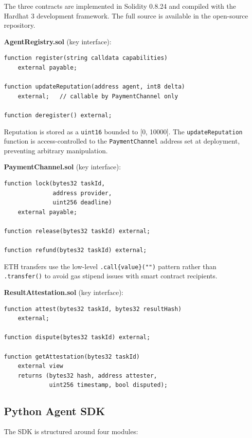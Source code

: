 \documentclass[conference]{IEEEtran}
\begin{document}
The three contracts are implemented in Solidity 0.8.24 and compiled
with the Hardhat 3 development framework.  The full source is
available in the open-source repository.

\textbf{AgentRegistry.sol} (key interface):
\begin{lstlisting}[caption={AgentRegistry interface}]
function register(string calldata capabilities)
    external payable;

function updateReputation(address agent, int8 delta)
    external;   // callable by PaymentChannel only

function deregister() external;
\end{lstlisting}

Reputation is stored as a \texttt{uint16} bounded to [0, 10000].
The \texttt{updateReputation} function is access-controlled to the
\texttt{PaymentChannel} address set at deployment, preventing arbitrary
manipulation.

\textbf{PaymentChannel.sol} (key interface):
\begin{lstlisting}[caption={PaymentChannel interface}]
function lock(bytes32 taskId,
              address provider,
              uint256 deadline)
    external payable;

function release(bytes32 taskId) external;

function refund(bytes32 taskId) external;
\end{lstlisting}

ETH transfers use the low-level \texttt{.call\{value\}("")} pattern
rather than \texttt{.transfer()} to avoid gas stipend issues with
smart contract recipients.

\textbf{ResultAttestation.sol} (key interface):
\begin{lstlisting}[caption={ResultAttestation interface}]
function attest(bytes32 taskId, bytes32 resultHash)
    external;

function dispute(bytes32 taskId) external;

function getAttestation(bytes32 taskId)
    external view
    returns (bytes32 hash, address attester,
             uint256 timestamp, bool disputed);
\end{lstlisting}

\subsection{Python Agent SDK}

The SDK is structured around four modules:
\end{document}
